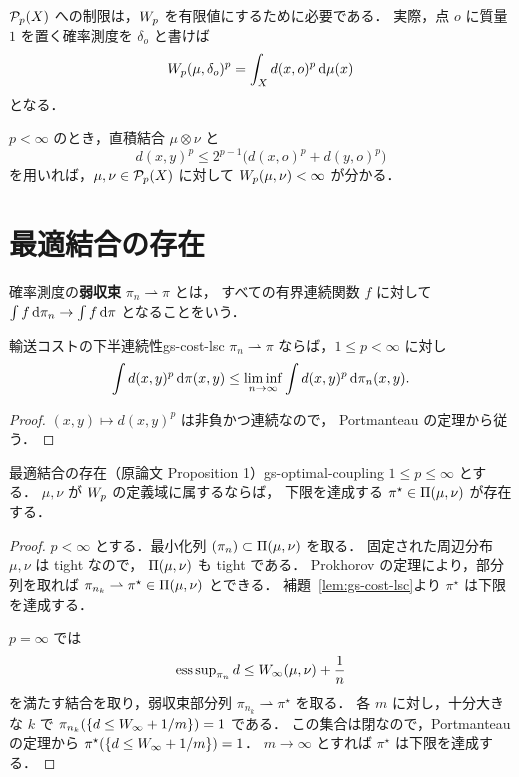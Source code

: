 $\mathcal{P}_{p}(X)$ への制限は，$W_p$ を有限値にするために必要である．
実際，点 $o$ に質量 $1$ を置く確率測度を $\delta_o$ と書けば
\[
  W_p(\mu,\delta_o)^p
  =
  \int_X d(x,o)^p\,\mathrm{d}\mu(x)
\]
となる．

$p<\infty$ のとき，直積結合 $\mu\otimes\nu$ と
\[
  d(x,y)^p
  \leq
  2^{p-1}\bigl(d(x,o)^p+d(y,o)^p\bigr)
\]
を用いれば，$\mu,\nu\in\mathcal{P}_{p}(X)$ に対して $W_p(\mu,\nu)<\infty$ が分かる．

\section{最適結合の存在}
\label{sec:optimal-coupling}

確率測度の\textbf{弱収束} $\pi_n\rightharpoonup\pi$ とは，
すべての有界連続関数 $f$ に対して
$\int f\,\mathrm{d}\pi_n\to\int f\,\mathrm{d}\pi$ となることをいう．

\begin{lemma}{輸送コストの下半連続性}{gs-cost-lsc}
  $\pi_n\rightharpoonup\pi$ ならば，$1\leq p<\infty$ に対し
  \[
    \int d(x,y)^p\,\mathrm{d}\pi(x,y)
    \leq
    \liminf_{n\to\infty}
    \int d(x,y)^p\,\mathrm{d}\pi_n(x,y).
  \]
\end{lemma}

\begin{proof}
  $(x,y)\mapsto d(x,y)^p$ は非負かつ連続なので，
  Portmanteau の定理から従う．
\end{proof}

\begin{proposition}{最適結合の存在（原論文 Proposition 1）}{gs-optimal-coupling}
  $1\leq p\leq\infty$ とする．
  $\mu,\nu$ が $W_p$ の定義域に属するならば，
  下限を達成する $\pi^\star\in\Pi(\mu,\nu)$ が存在する．
\end{proposition}

\begin{proof}
  $p<\infty$ とする．最小化列
  $(\pi_n)\subset\Pi(\mu,\nu)$ を取る．
  固定された周辺分布 $\mu,\nu$ は tight なので，
  $\Pi(\mu,\nu)$ も tight である．
  Prokhorov の定理により，部分列を取れば
  $\pi_{n_k}\rightharpoonup\pi^\star\in\Pi(\mu,\nu)$ とできる．
  補題~\ref{lem:gs-cost-lsc}より $\pi^\star$ は下限を達成する．

  $p=\infty$ では
  \[
    \operatorname{ess\,sup}_{\pi_n}d
    \leq
    W_\infty(\mu,\nu)+\frac1n
  \]
  を満たす結合を取り，弱収束部分列 $\pi_{n_k}\rightharpoonup\pi^\star$ を取る．
  各 $m$ に対し，十分大きな $k$ で
  $\pi_{n_k}(\{d\leq W_\infty+1/m\})=1$ である．
  この集合は閉なので，Portmanteau の定理から
  $\pi^\star(\{d\leq W_\infty+1/m\})=1$．
  $m\to\infty$ とすれば $\pi^\star$ は下限を達成する．
\end{proof}

